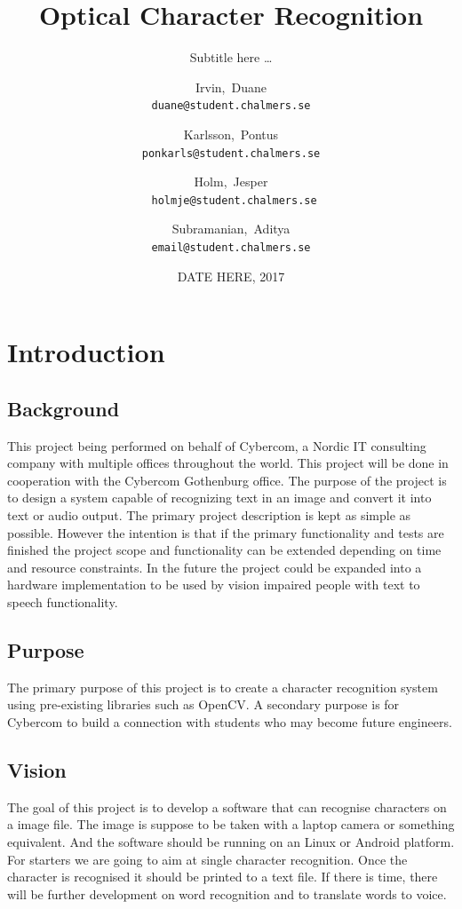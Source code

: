 \documentclass[a4paper, english]{scrartcl}
\title{Optical Character Recognition}
\subtitle{Subtitle here \ldots}
\author{Irvin,~Duane \\ \texttt{duane@student.chalmers.se}
  \and Karlsson,~Pontus \\ \texttt{ponkarls@student.chalmers.se}
  \and Holm,~Jesper \\ \texttt{~holmje@student.chalmers.se}
  \and Subramanian,~Aditya \\ \texttt{email@student.chalmers.se}
}
\date{DATE HERE, 2017}
\begin{document}
\clearpage\maketitle
\thispagestyle{empty}

\pagebreak

\setcounter{page}{1}
\hypersetup{linkcolor=black}
\tableofcontents

\pagebreak

\section{Introduction}
\subsection{Background}
This project being performed on behalf of Cybercom,
a Nordic IT consulting company with multiple offices throughout the world.
This project will be done in cooperation with the Cybercom Gothenburg office.
The purpose of the project is to design a system capable of recognizing text 
in an image and convert it into text or audio output. 
The primary project description is kept as simple as possible. 
However the intention is that if the primary functionality and tests are 
finished the project scope and functionality can be extended depending on 
time and resource constraints. 
In the future the project could be expanded into a hardware implementation 
to be used by vision impaired people with text to speech functionality.
\subsection{Purpose}
The primary purpose of this project is to create a character recognition
system using pre-existing libraries such as OpenCV. 
A secondary purpose is for Cybercom to build a connection with students 
who may become future engineers. 
\subsection{Vision}
The goal of this project is to develop a software that can recognise 
characters on a image file. 
The image is suppose to be taken with a laptop camera or something equivalent.
And the software should be running on an Linux or Android platform. 
For starters we are going to aim at single character recognition.
Once the character is recognised it should be printed to a text file.
If there is time, there will be further development on word recognition and
to translate words to voice.
\end{document}
